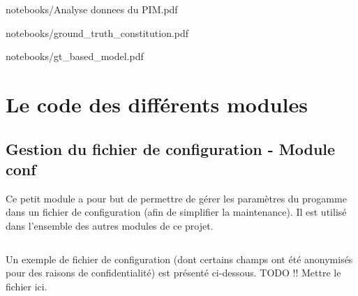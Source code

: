 \documentclass{report}
\begin{document}
        
                    {notebooks/Analyse donnees du PIM.pdf}

        
        {notebooks/ground_truth_constitution.pdf}

        

 
        
        {notebooks/gt_based_model.pdf}
        
    
    \chapter{Le code des différents modules}

    \section{Gestion du fichier de configuration - Module conf}
    \label{code:conf}
    Ce petit module a pour but de permettre de gérer les paramètres du progamme dans un fichier de configuration (afin de simplifier la maintenance).
    Il est utilisé dans l'ensemble des autres modules de ce projet.

    \begin{multicols}{2}
    \begin{spacing}{1.0}
        \inputminted[fontsize=\tiny]{python}{../src/conf.py}
    \end{spacing}
    \end{multicols}

    Un exemple de fichier de configuration (dont certains champs ont été anonymisés pour des raisons de confidentialité) est présenté ci-dessous.
    TODO !! Mettre le fichier ici.
\end{document}
